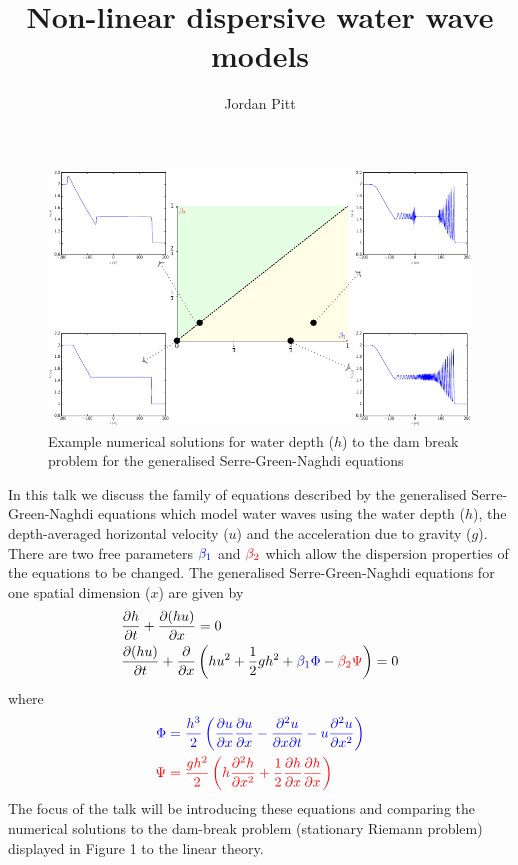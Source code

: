 \documentclass[10pt]{article}
\title{Non-linear dispersive water wave models}
\author{Jordan Pitt}
\date{}
\begin{document}
\maketitle
\begin{figure}[h!]
	\centering
	\includegraphics[width=1\textwidth]{3x3Grid.pdf}
	\caption{Example numerical solutions for water depth ($h$) to the dam break problem for the generalised Serre-Green-Naghdi equations}
\end{figure}
In this talk we discuss the family of equations described by the generalised Serre-Green-Naghdi equations which model water waves using the water depth ($h$), the depth-averaged horizontal velocity ($u$) and the acceleration due to gravity ($g$). There are two free parameters ${\color{blue} {\beta_1}}$ and ${\color{red} {\beta_2}}$ which allow the dispersion properties of the equations to be changed. The generalised Serre-Green-Naghdi equations for one spatial dimension ($x$) are given by
\begin{align*}
&\dfrac{\partial h}{\partial t} + \dfrac{\partial (hu)}{\partial x} = 0\\
&\dfrac{\partial (hu)}{\partial t} + \dfrac{\partial }{\partial x} \left( hu^2 + \frac{1}{2}gh^2  +  {\color{blue} {\beta_1} \Phi } -   {\color{red} {\beta_2}\Psi}  \right)= 0 \\
\end{align*}
where
\begin{align*}
\color{blue} \Phi  & \color{blue}= \frac{h^3}{2}\left( \frac{\partial u}{\partial x}\frac{\partial u}{\partial x} - \frac{\partial^2 u}{\partial x \partial t} - u\frac{\partial^2 u}{\partial x^2}\right) \\
\color{red} \Psi & \color{red}=  \frac{gh^2}{2} \left(h \frac{\partial^2 h}{\partial x^2} + \frac{1}{2} \frac{\partial h}{\partial x}\frac{\partial h}{\partial x}\right)
\end{align*}
The focus of the talk will be introducing these equations and comparing the numerical solutions to the dam-break problem (stationary Riemann problem) displayed in Figure 1 to the linear theory. 
\end{document}
